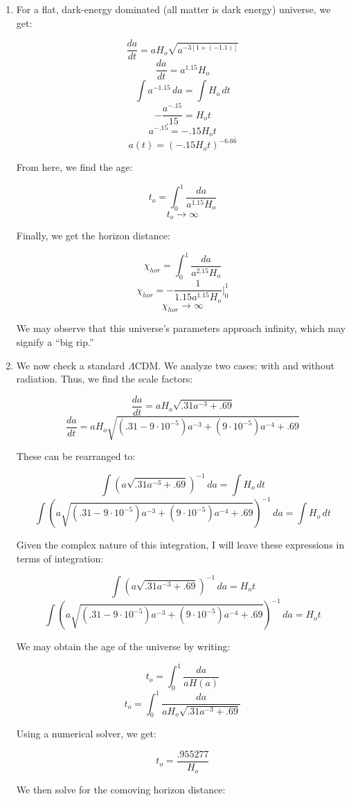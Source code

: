 \begin{enumerate}
\begin{enumerate}
      \item For a flat, dark-energy dominated (all matter is dark energy) universe, we get:

        $$\frac{da}{dt}=aH_o\sqrt{a^{-3[1+(-1.1)]}}$$
        $$\frac{da}{dt}=a^{1.15}H_o$$
        $$\int a^{-1.15}\,da=\int H_o\,dt$$
        $$-\frac{a^{-.15}}{.15}=H_ot$$
        $$a^{-.15}=-.15H_ot$$
        $$\boxed{a(t)=(-.15H_ot)^{-6.6\bar{6}}}$$

        From here, we find the age:

        $$t_o=\int_0^1\frac{da}{a^{1.15}H_o}$$
        $$\boxed{t_o\to\infty}$$

        Finally, we get the horizon distance:

        $$\chi_{hor}=\int_0^1 \frac{da}{a^{2.15}H_o}$$
        $$\chi_{hor}=-\frac{1}{1.15a^{1.15}H_o}\Big|_0^1$$
        $$\boxed{\chi_{hor}\to\infty}$$

        We may observe that this universe's parameters approach infinity, which may signify a ``big rip.''

      \item We now check a standard $\Lambda$CDM. We analyze two cases: with and without radiation. Thus, we find the scale factors:

        $$\frac{da}{dt}=aH_o\sqrt{.31a^{-3}+.69}$$
        $$\frac{da}{dt}=aH_o\sqrt{(.31-9\cdot10^{-5})a^{-3}+(9\cdot10^{-5})a^{-4}+.69}$$

        These can be rearranged to:

        $$\int \left(a\sqrt{.31a^{-3}+.69}\right)^{-1}\,da=\int H_o\,dt$$
        $$\int \left(a\sqrt{(.31-9\cdot10^{-5})a^{-3}+(9\cdot10^{-5})a^{-4}+.69}\right)^{-1}\,da=\int H_o\,dt$$

        Given the complex nature of this integration, I will leave these expressions in terms of integration:

        $$\boxed{\int \left(a\sqrt{.31a^{-3}+.69}\right)^{-1}\,da=H_ot}$$
        $$\boxed{\int \left(a\sqrt{(.31-9\cdot10^{-5})a^{-3}+(9\cdot10^{-5})a^{-4}+.69}\right)^{-1}\,da=H_ot}$$

        We may obtain the age of the universe by writing:

        $$t_o=\int_0^1\frac{da}{aH(a)}$$
        $$t_o=\int_0^1\frac{da}{aH_o\sqrt{.31a^{-3}+.69}}$$

        Using a numerical solver, we get:

        $$\boxed{t_o=\frac{.955277}{H_o}}$$

        We then solve for the comoving horizon distance:


\end{enumerate}
\end{enumerate}
